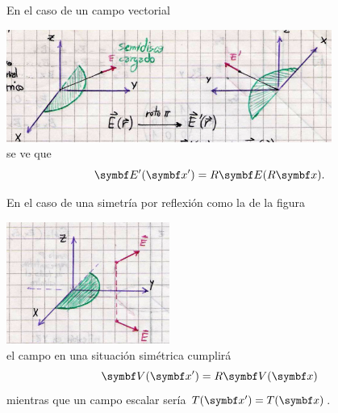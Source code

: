 \documentclass[10pt,oneside]{CBFT_book}
\begin{document}
En el caso de un campo vectorial 

\includegraphics[width=0.8\textwidth]{images/fig_ft1_rotacion_vectorial.jpg}\\
se ve que 
\[
	\vb{E}'(\vb{x}') = R\vb{E}( R\vb{x}).
\]

En el caso de una simetría por reflexión como la de la figura 

\includegraphics[width=0.4\textwidth]{images/fig_ft1_reflexion_vectorial.jpg}\\
el campo en una situación simétrica cumplirá 
\[
	\vb{V}(\vb{x}') = R \vb{V}(\vb{x})
\]
mientras que un campo escalar sería $T(\vb{x}')=T(\vb{x})$.

\end{document}
